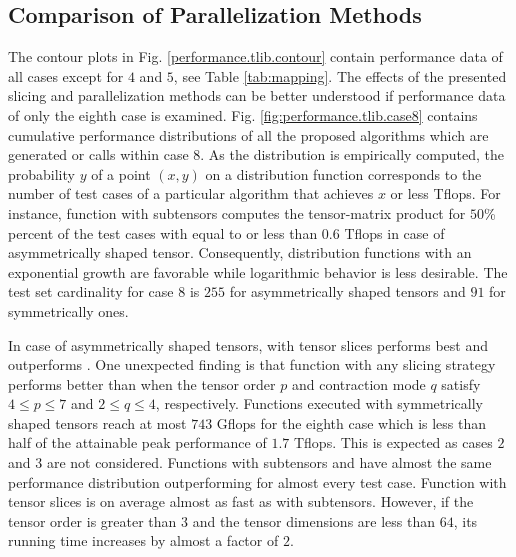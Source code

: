 \subsection{Comparison of Parallelization Methods}
The contour plots in Fig. \ref{performance.tlib.contour} contain performance data of all cases except for $4$ and $5$, see Table \ref{tab:mapping}.
The effects of the presented slicing and parallelization methods can be better understood if performance data of only the eighth case is examined.
Fig. \ref{fig:performance.tlib.case8} contains cumulative performance distributions of all the proposed algorithms which are generated  or  calls within case 8.
As the distribution is empirically computed, the probability $y$ of a point $(x,y)$ on a distribution function corresponds to the number of test cases of a particular algorithm that achieves $x$ or less Tflops.
For instance, function  with subtensors computes the tensor-matrix product for $50$\% percent of the test cases with equal to or less than 0.6 Tflops in case of asymmetrically shaped tensor.
Consequently, distribution functions with an exponential growth are favorable while logarithmic behavior is less desirable.
The test set cardinality for case 8 is $255$ for asymmetrically shaped tensors and $91$ for symmetrically ones.

In case of asymmetrically shaped tensors,  with tensor slices performs best and outperforms .
One unexpected finding is that function  with any slicing strategy performs better than  when the tensor order $p$ and contraction mode $q$ satisfy $4 \leq p \leq 7$ and $2 \leq q \leq 4$, respectively.
Functions executed with symmetrically shaped tensors reach at most $743$ Gflops for the eighth case which is less than half of the attainable peak performance of $1.7$ Tflops.
This is expected as cases $2$ and $3$ are not considered.
Functions  with subtensors and  have almost the same performance distribution outperforming  for almost every test case.
Function  with tensor slices is on average almost as fast as with subtensors.
However, if the tensor order is greater than $3$ and the tensor dimensions are less than $64$, its running time increases by almost a factor of $2$.

